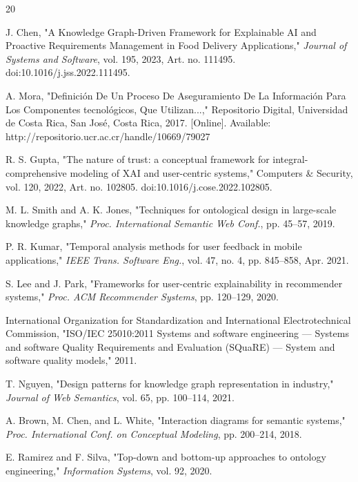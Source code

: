 \documentclass[conference]{IEEEtran}
\begin{document}
\begin{thebibliography}{20}

 J. Chen, "A Knowledge Graph-Driven Framework for Explainable AI and Proactive Requirements Management in Food Delivery Applications," \emph{Journal of Systems and Software}, vol. 195, 2023, Art. no. 111495. doi:10.1016/j.jss.2022.111495.

 A. Mora, "Definición De Un Proceso De Aseguramiento De La Información Para Los Componentes tecnológicos, Que Utilizan...," Repositorio Digital, Universidad de Costa Rica, San José, Costa Rica, 2017. [Online]. Available: http://repositorio.ucr.ac.cr/handle/10669/79027

 R. S. Gupta, "The nature of trust: a conceptual framework for integral-comprehensive modeling of XAI and user-centric systems," Computers \& Security, vol. 120, 2022, Art. no. 102805. doi:10.1016/j.cose.2022.102805.

 M. L. Smith and A. K. Jones, "Techniques for ontological design in large-scale knowledge graphs," \emph{Proc. International Semantic Web Conf.}, pp. 45--57, 2019.

 P. R. Kumar, "Temporal analysis methods for user feedback in mobile applications," \emph{IEEE Trans. Software Eng.}, vol. 47, no. 4, pp. 845--858, Apr. 2021.

 S. Lee and J. Park, "Frameworks for user-centric explainability in recommender systems," \emph{Proc. ACM Recommender Systems}, pp. 120--129, 2020.

 International Organization for Standardization and International Electrotechnical Commission, "ISO/IEC 25010:2011 Systems and software engineering — Systems and software Quality Requirements and Evaluation (SQuaRE) — System and software quality models," 2011.

 T. Nguyen, "Design patterns for knowledge graph representation in industry," \emph{Journal of Web Semantics}, vol. 65, pp. 100--114, 2021.

 A. Brown, M. Chen, and L. White, "Interaction diagrams for semantic systems," \emph{Proc. International Conf. on Conceptual Modeling}, pp. 200--214, 2018.

 E. Ramirez and F. Silva, "Top-down and bottom-up approaches to ontology engineering," \emph{Information Systems}, vol. 92, 2020.


\end{thebibliography}
\end{document}
